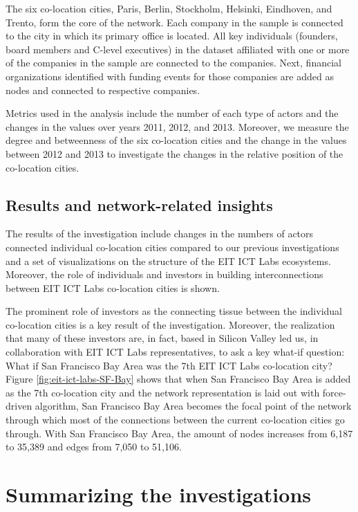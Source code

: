 The six co-location cities, Paris, Berlin, Stockholm, Helsinki, Eindhoven, and Trento, form the core of the network. Each company in the sample is connected to the city in which its primary office is located. All key individuals (founders, board members and C-level executives) in the dataset affiliated with one or more of the companies in the sample are connected to the companies. Next, financial organizations identified with funding events for those companies are added as nodes and connected to respective companies. 

Metrics used in the analysis include the number of each type of actors and the changes in the values over years 2011, 2012, and 2013. Moreover, we measure the degree and betweenness of the six co-location cities and the change in the values between 2012 and 2013 to investigate the changes in the relative position of the co-location cities.

\subsection{Results and network-related insights}

The results of the investigation include changes in the numbers of actors connected individual co-location cities compared to our previous investigations and a set of visualizations on the structure of the EIT ICT Labs ecosystems. Moreover, the role of individuals and investors in building interconnections between EIT ICT Labs co-location cities is shown. 

The prominent role of investors as the connecting tissue between the individual co-location cities is a key result of the investigation. Moreover, the realization that many of these investors are, in fact, based in Silicon Valley led us, in collaboration with EIT ICT Labs representatives, to ask a key what-if question: What if San Francisco Bay Area was the 7th EIT ICT Labs co-location city? Figure \ref{fig:eit-ict-labs-SF-Bay} shows that when San Francisco Bay Area is added as the 7th co-location city and the network representation is laid out with force-driven algorithm, San Francisco Bay Area becomes the focal point of the network through which most of the connections between the current co-location cities go through. With San Francisco Bay Area, the amount of nodes increases from 6,187 to 35,389 and edges from 7,050 to 51,106.

\section{Summarizing the investigations}


